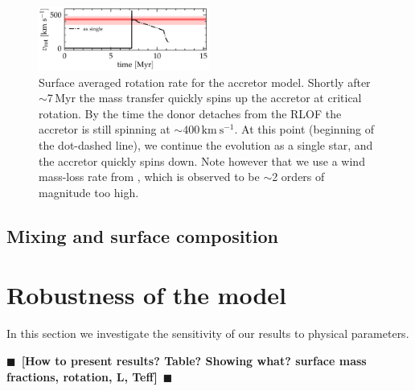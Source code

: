 \documentclass[twocolumn,twocolappendix,trackchanges]{aastex63}
\newcommand{\kms}{{\mathrm{km\ s^{-1}}}}
\newcommand{\todo}[1]{{\large $\blacksquare$~\textbf{\color{red}[#1]}}~$\blacksquare$}
\begin{document}
\begin{figure}[htbp]
  \includegraphics[width=0.5\textwidth]{zeta_rot}
  \caption{Surface averaged rotation rate for the accretor
    model. Shortly after $\sim$7\,Myr the mass transfer quickly spins
    up the accretor at critical rotation. By the time the donor
    detaches from the RLOF the accretor is still spinning at
    $\sim$$400\,\kms$. At this point (beginning of the dot-dashed line), we continue the evolution as a single star, and the accretor quickly spins down. Note however that we use a wind mass-loss rate from \cite{vink:01}, which is observed to be
    $\sim$2 orders of magnitude too high.}
  \label{fig:rot}
\end{figure}





\subsection{Mixing and surface composition}


\section{Robustness of the model}
\label{sec:param_variations}

In this section we investigate the sensitivity of our results to
physical parameters.

\todo{How to present results? Table? Showing what? surface mass
  fractions, rotation, L, Teff}
\end{document}
